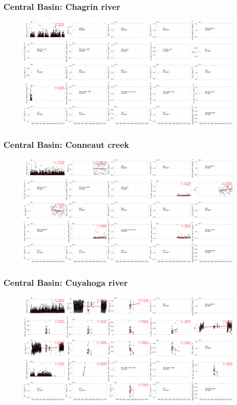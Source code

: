 \documentclass{beamer}
\begin{document}
\begin{frame}
\frametitle{Central Basin: Chagrin river}
\begin{figure}
\includegraphics[width=\textwidth]{rivers/Central basin/plot_all chagrinriver.png}
\end{figure}
\end{frame}

\begin{frame}
\frametitle{Central Basin: Conneaut creek}
\begin{figure}
\includegraphics[width=\textwidth]{rivers/Central basin/plot_all conneautcreek.png}
\end{figure}
\end{frame}

\begin{frame}
\frametitle{Central Basin: Cuyahoga river}
\begin{figure}
\includegraphics[width=\textwidth]{rivers/Central basin/plot_all cuyahogariver.png}
\end{figure}
\end{frame}
\end{document}
